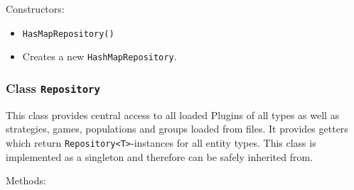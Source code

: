 \documentclass[parskip=full,11pt]{scrartcl}
\begin{document}
Constructors:

\begin{itemize} \itemsep -10pt
	\item \texttt{HasMapRepository()}
	\item[] Creates a new \texttt{HashMapRepository}.
\end{itemize}

\subsubsection{Class \texttt{Repository}}

This class provides central access to all loaded Plugins of all types as well as strategies, games, populations and groups loaded from files. It provides getters which return \texttt{Repository<T>}-instances for all entity types. This class is implemented as a singleton and therefore can be safely inherited from. 

Methods:
\end{document}

